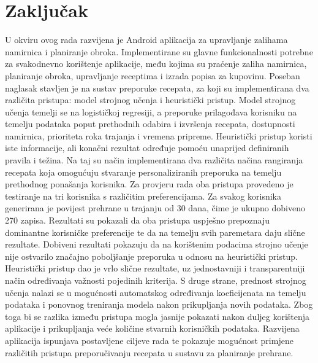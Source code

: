 \documentclass[diplomskirad]{fer}
\begin{document}
\chapter{Zaključak}
U okviru ovog rada razvijena je Android aplikacija za upravljanje zalihama namirnica i planiranje obroka. Implementirane su glavne funkcionalnosti potrebne za svakodnevno korištenje aplikacije, među kojima su praćenje zaliha namirnica, planiranje obroka, upravljanje receptima i izrada popisa za kupovinu. Poseban naglasak stavljen je na sustav preporuke recepata, za koji su implementirana dva različita pristupa: model strojnog učenja i heuristički pristup. Model strojnog učenja temelji se na logističkoj regresiji, a preporuke prilagođava korisniku na temelju podataka poput prethodnih odabira i izvršenja recepata, dostupnosti namirnica, prioriteta roka trajanja i vremena pripreme. Heuristički pristup koristi iste informacije, ali konačni rezultat određuje pomoću unaprijed definiranih pravila i težina. Na taj su način implementirana dva različita načina rangiranja recepata koja omogućuju stvaranje personaliziranih preporuka na temelju prethodnog ponašanja korisnika. Za provjeru rada oba pristupa provedeno je testiranje na tri korisnika s različitim preferencijama. Za svakog korisnika generirana je povijest prehrane u trajanju od 30 dana, čime je ukupno dobiveno 270 zapisa. Rezultati su pokazali da oba pristupa uspješno prepoznaju dominantne korisničke preferencije te da na temelju svih paremetara daju slične rezultate. Dobiveni rezultati pokazuju da na korištenim podacima strojno učenje nije ostvarilo značajno poboljšanje preporuka u odnosu na heuristički pristup. Heuristički pristup dao je vrlo slične rezultate, uz jednostavniji i transparentniji način određivanja važnosti pojedinih kriterija. S druge strane, prednost strojnog učenja nalazi se u mogućnosti automatskog određivanja koeficijenata na temelju podataka i ponovnog treniranja modela nakon prikupljanja novih podataka. Zbog toga bi se razlika između pristupa mogla jasnije pokazati nakon duljeg korištenja aplikacije i prikupljanja veće količine stvarnih korisničkih podataka. Razvijena aplikacija ispunjava postavljene ciljeve rada te pokazuje mogućnost primjene različitih pristupa preporučivanju recepata u sustavu za planiranje prehrane.
\label{pog:zakljucak}






\end{document}
